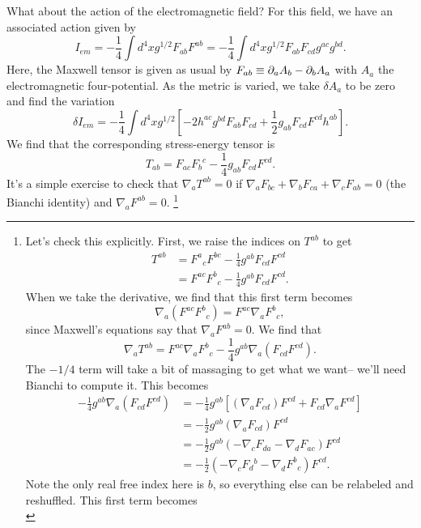 What about the action of the electromagnetic field? For this field, we have an associated action given by
$$I_{em}=-\frac{1}{4}\int d^4x g^{1/2} F_{ab} F^{ab} = -\frac{1}{4}\int d^4x g^{1/2} F_{ab} F_{cd} g^{ac} g^{bd}.$$
Here, the Maxwell tensor is given as usual by $F_{ab}\equiv \partial_a A_b -\partial_b A_a$ with $A_a$ the electromagnetic four-potential. As the metric is varied, we take $\delta A_a$ to be zero and find the variation
$$\delta I_{em}=-\frac{1}{4} \int d^4x g^{1/2} [-2 h^{ac} g^{bd} F_{ab} F_{cd} + \frac{1}{2} g_{ab} F_{cd} F^{cd} h^{ab}].$$
We find that the corresponding stress-energy tensor is
$$T_{ab}=F_{ac} {F_b}^c - \frac{1}{4} g_{ab} F_{cd} F^{cd}.$$
It's a simple exercise to check that $\nabla_a T^{ab}=0$ if $\nabla_a F_{bc} + \nabla_b F_{ca} + \nabla_c F_{ab}=0$ (the Bianchi identity) and $\nabla_a F^{ab}=0$.%
    \footnote{Let's check this explicitly. First, we raise the indices on $T^{ab}$ to get
    \begin{align*}
        T^{ab}&=F^a{}_c F^{bc} -\frac{1}{4}g^{ab} F_{cd} F^{cd}\\
        &= F^{ac} F^b{}_c-\frac{1}{4}g^{ab} F_{cd} F^{cd}.
    \end{align*}
    When we take the derivative, we find that this first term becomes
    \begin{equation*}
        \nabla_a (F^{ac} F^b{}_c)= F^{ac} \nabla_a F^b{}_c,
    \end{equation*}
    since Maxwell's equations say that $\nabla_a F^{ab}=0$. We find that 
    \begin{equation*}
        \nabla_a T^{ab} = F^{ac} \nabla_a F^b{}_c -\frac{1}{4}g^{ab} \nabla_a (F_{cd} F^{cd}).
    \end{equation*} The $-1/4$ term will take a bit of massaging to get what we want-- we'll need Bianchi to compute it. This becomes
    \begin{align*}
        -\frac{1}{4}g^{ab} \nabla_a (F_{cd} F^{cd}) &= -\frac{1}{4} g^{ab} [(\nabla_a F_{cd})F^{cd} +F_{cd} \nabla_a F^{cd}]\\
        &= -\frac{1}{2} g^{ab} (\nabla_a F_{cd})F^{cd}\\
        &= -\frac{1}{2} g^{ab} (-\nabla_c F_{da} - \nabla_d F_{ac})F^{cd}\\
        &= -\frac{1}{2} (-\nabla_c F_d{}^b -\nabla_d F^b{}_c)F^{cd}.
    \end{align*}
    Note the only real free index here is $b$, so everything else can be relabeled and reshuffled. This first term becomes 
    \begin{equation*}

\end{equation*}}
